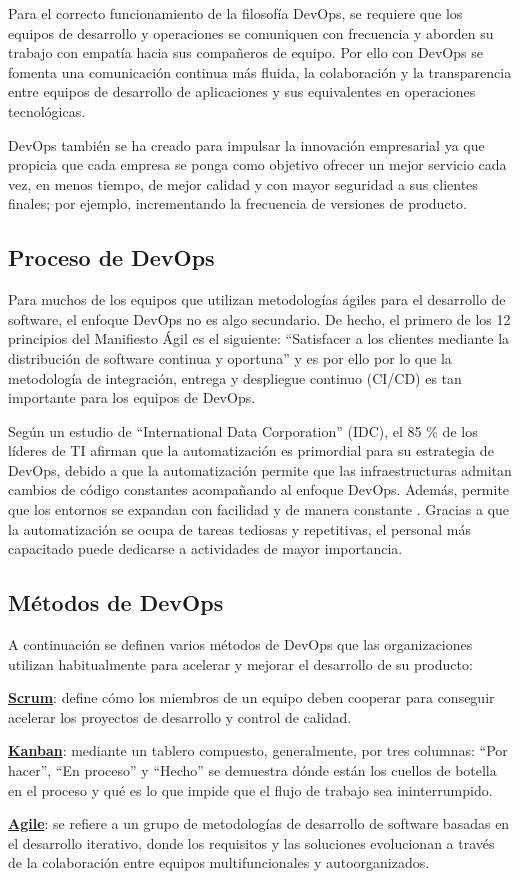 Para el correcto funcionamiento de la filosofía DevOps, se requiere que los equipos de desarrollo y operaciones se comuniquen con frecuencia y aborden su trabajo con empatía hacia sus compañeros de equipo. Por ello con DevOps se fomenta una comunicación continua más fluida, la colaboración y la transparencia entre equipos de desarrollo de aplicaciones y sus equivalentes en operaciones tecnológicas.

DevOps también se ha creado para impulsar la innovación empresarial ya que propicia que cada empresa se ponga como objetivo ofrecer un mejor servicio cada vez, en menos tiempo, de mejor calidad y con mayor seguridad a sus clientes finales; por ejemplo, incrementando la frecuencia de versiones de producto.

\subsection{Proceso de DevOps}
Para muchos de los equipos que utilizan metodologías ágiles para el desarrollo de software, el enfoque DevOps no es algo secundario. De hecho, el primero de los 12 principios del Manifiesto Ágil es el siguiente: ``Satisfacer a los clientes mediante la distribución de software continua y oportuna'' y es por ello por lo que la metodología de integración, entrega y despliegue continuo (CI/CD) es tan importante para los equipos de DevOps.

Según un estudio de ``International Data Corporation'' (IDC), el 85 \% de los líderes de TI afirman que la automatización es primordial para su estrategia de DevOps, debido a que la automatización permite que las infraestructuras admitan cambios de código constantes acompañando al enfoque DevOps. Además, permite que los entornos se expandan con facilidad y de manera constante \cite{redHatDevOps}. Gracias a que la automatización se ocupa de tareas tediosas y repetitivas, el personal más capacitado puede dedicarse a actividades de mayor importancia.

\subsection{Métodos de DevOps}
A continuación se definen varios métodos de DevOps que las organizaciones utilizan habitualmente para acelerar y mejorar el desarrollo de su producto:
\begin{compactitem}
    \item \textbf{\underline{Scrum}}: define cómo los miembros de un equipo deben cooperar para conseguir acelerar los proyectos de desarrollo y control de calidad.
    \item \textbf{\underline{Kanban}}: mediante un tablero compuesto, generalmente, por tres columnas: “Por hacer”, “En proceso” y “Hecho” se demuestra dónde están los cuellos de botella en el proceso y qué es lo que impide que el flujo de trabajo sea ininterrumpido.
    \item \textbf{\underline{Agile}}: se refiere a un grupo de metodologías de desarrollo de software basadas en el desarrollo iterativo, donde los requisitos y las soluciones evolucionan a través de la colaboración entre equipos multifuncionales y autoorganizados.
\end{compactitem}

